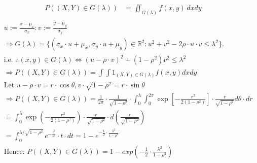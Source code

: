 \documentclass[hidelinks]{article}
\begin{document}
\begin{enumerate}
    \begin{align*}
        P((X, Y ) \in G(\lambda)) &= \iint_{G(\lambda)} f(x,y) \, dxdy \\
    \end{align*}
    \begin{align*}
        &u:=\frac{x-\mu_{x}}{\sigma_{x}}:v:=\frac{y-\mu_{y}}{\sigma_{y}} \\
        &\Rightarrow G(\lambda)=\{(\sigma_{x}\cdot u+\mu_{x},\sigma_{y}\cdot u+\mu_{y})\in \mathbb{R}^{2}:u^{2}+v^{2}-2\rho\cdot u\cdot v\leq\lambda^{2}\}. \\
        &\text{i.e. } \therefore(x,y)\in G(\lambda)\Leftrightarrow(u-\rho\cdot v)^{2}+(1-\rho^{2})v^{2}\leq\lambda^{2} \\
        &\Rightarrow P((X,Y)\in G(\lambda))=\int\int1_{(X,Y)\in G(\lambda)}f(x,y)dxdy \\
        &\text{Let }u-\rho\cdot v=r\cdot\cos\theta,v\cdot\sqrt{1-\rho^2}=r\cdot\sin\theta \\
        &\Rightarrow P((X,Y)\in G(\lambda))=\frac{1}{2\pi}\cdot\frac{1}{\sqrt{1-\rho^{2}}}\cdot\int_{0}^{\lambda}\int_{0}^{2\pi}\exp[-\frac{r^{2}}{2(1-\rho^{2})}]\cdot\frac{r}{\sqrt{1-\rho^{2}}}d\theta\cdot dr \\
        &=\int_{0}^{\lambda}\exp(-\frac{r^{2}}{2(1-\rho^{2})})\cdot\frac{r}{\sqrt{1-\rho^{2}}}\cdot d(\frac{r}{\sqrt{1-\rho^{2}}}) \\
        &=\int_{0}^{\lambda/\sqrt{1-\rho^{2}}}e^{-\frac{t^{2}}{2}}\cdot t\cdot dt=1-e^{-\frac{1}{2}\cdot\frac{\lambda^{2}}{1-\rho^{2}}} \\
        &\text{Hence: }P((X,Y)\in G(\lambda))=1-exp(-\frac{1}{2}\cdot\frac{\lambda^{2}}{1-\rho^{2}})
    \end{align*}
\end{enumerate}
\end{document}
